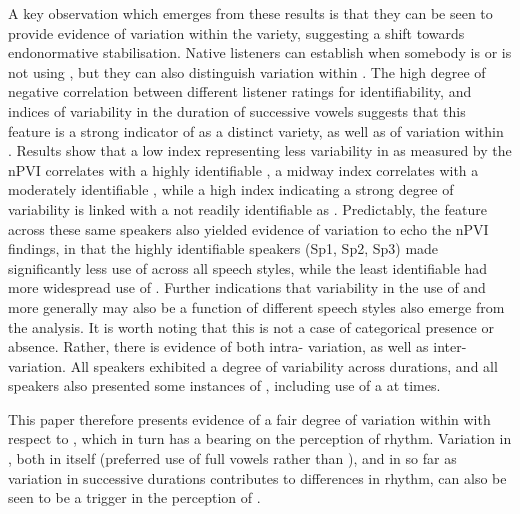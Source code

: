 \documentclass[output=paper]{langsci/langscibook}
\begin{document}
A key observation which emerges from these results is that they can be seen to provide evidence of variation within the variety, suggesting a shift towards endonormative stabilisation. Native listeners can establish when somebody is or is not using , but they can also distinguish variation within . The high degree of negative correlation between different listener ratings for  identifiability, and indices of variability in the duration of successive vowels suggests that this feature is a strong indicator of  as a distinct variety, as well as of variation within . Results show that a low index representing less variability in  as measured by the nPVI correlates with a highly identifiable  , a midway index correlates with a moderately identifiable  , while a high index indicating a strong degree of variability is linked with a  not readily identifiable as . Predictably, the  feature across these same speakers also yielded evidence of variation to echo the nPVI findings, in that the highly identifiable  speakers (Sp1, Sp2, Sp3) made significantly less use of  across all speech styles, while the least identifiable  had more widespread use of . Further indications that variability in the use of  and  more generally may also be a function of different speech styles also emerge from the analysis. It is worth noting that this is not a case of categorical presence or absence. Rather, there is evidence of both intra- variation, as well as inter- variation. All speakers exhibited a degree of variability across  durations, and all speakers also presented some instances of , including use of a  at times. 

This paper therefore presents evidence of a fair degree of variation within  with respect to , which in turn has a bearing on the perception of rhythm. Variation in , both in itself (preferred use of full vowels rather than ), and in so far as variation in successive  durations contributes to differences in rhythm, can also be seen to be a trigger in the perception of . 
\end{document}

